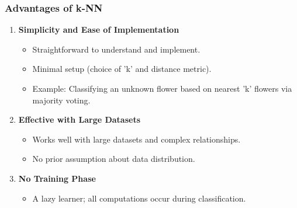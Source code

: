 \documentclass[aspectratio=169]{beamer}
\begin{document}
\begin{frame}[fragile]
    \frametitle{Advantages of k-NN}
    \begin{enumerate}
        \item \textbf{Simplicity and Ease of Implementation} 
        \begin{itemize}
            \item Straightforward to understand and implement.
            \item Minimal setup (choice of 'k' and distance metric).
            \item Example: Classifying an unknown flower based on nearest 'k' flowers via majority voting.
        \end{itemize}
        
        \item \textbf{Effective with Large Datasets} 
        \begin{itemize}
            \item Works well with large datasets and complex relationships.
            \item No prior assumption about data distribution.
        \end{itemize}
        
        \item \textbf{No Training Phase} 
        \begin{itemize}
            \item A lazy learner; all computations occur during classification.
        \end{itemize}
    \end{enumerate}
\end{frame}
\end{document}
